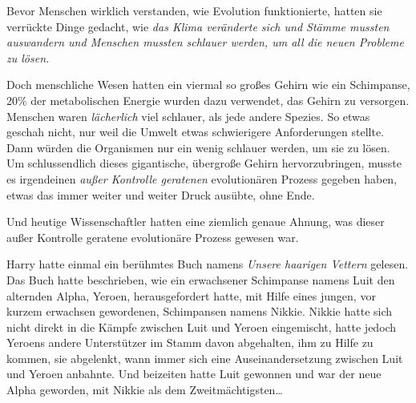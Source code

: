 Bevor Menschen wirklich verstanden, wie Evolution funktionierte, hatten sie verrückte Dinge gedacht, wie \emph{das Klima veränderte sich und Stämme mussten auswandern und Menschen mussten schlauer werden, um all die neuen Probleme zu lösen.}

Doch menschliche Wesen hatten ein viermal so großes Gehirn wie ein Schimpanse, 20\% der metabolischen Energie wurden dazu verwendet, das Gehirn zu versorgen. Menschen waren \emph{lächerlich} viel schlauer, als jede andere Spezies. So etwas geschah nicht, nur weil die Umwelt etwas schwierigere Anforderungen stellte. Dann würden die Organismen nur ein wenig schlauer werden, um sie zu lösen. Um schlussendlich dieses gigantische, übergroße Gehirn hervorzubringen, musste es irgendeinen \emph{außer Kontrolle geratenen} evolutionären Prozess gegeben haben, etwas das immer weiter und weiter Druck ausübte, ohne Ende.

Und heutige Wissenschaftler hatten eine ziemlich genaue Ahnung, was dieser außer Kontrolle geratene evolutionäre Prozess gewesen war.

Harry hatte einmal ein berühmtes Buch namens \emph{Unsere haarigen Vettern} gelesen.
Das Buch hatte beschrieben, wie ein erwachsener Schimpanse namens Luit den alternden Alpha, Yeroen, herausgefordert hatte, mit Hilfe eines jungen, vor kurzem erwachsen gewordenen, Schimpansen namens Nikkie. Nikkie hatte sich nicht direkt in die Kämpfe zwischen Luit und Yeroen eingemischt, hatte jedoch Yeroens andere Unterstützer im Stamm davon abgehalten, ihm zu Hilfe zu kommen, sie abgelenkt, wann immer sich eine Auseinandersetzung zwischen Luit und Yeroen anbahnte. Und beizeiten hatte Luit gewonnen und war der neue Alpha geworden, mit Nikkie als dem Zweitmächtigsten…

